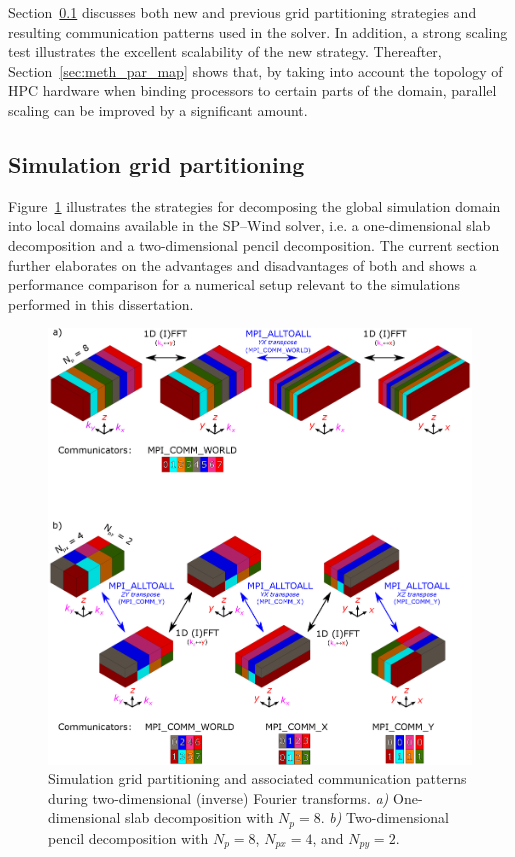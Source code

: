 Section~\ref{sec:meth_par_part} discusses both new and previous grid partitioning strategies and resulting communication patterns used in the solver. In addition, a strong scaling test illustrates the excellent scalability of the new strategy. Thereafter, Section~\ref{sec:meth_par_map} shows that, by taking into account the topology of HPC hardware when binding processors to certain parts of the domain, parallel scaling can be improved by a significant amount.

\subsection{Simulation grid partitioning}\label{sec:meth_par_part}
Figure~\ref{fig:grid_partitioning} illustrates the strategies for decomposing the global simulation domain into local domains available in the SP--Wind solver, i.e. a one-dimensional slab decomposition and a two-dimensional pencil decomposition. The current section further elaborates on the advantages and disadvantages of both and shows a performance comparison for a numerical setup relevant to the simulations performed in this dissertation. 

\begin{figure}
	\includegraphics[width=\textwidth]{figures/meth_slab_pencil.eps}
	\caption{Simulation grid partitioning and associated communication patterns during two-dimensional (inverse) Fourier transforms. \emph{a)} One-dimensional slab decomposition with $N_p = 8$. \emph{b)} Two-dimensional pencil decomposition with $N_p = 8$, $N_{px} = 4$, and $N_{py} = 2$. \label{fig:grid_partitioning}}
\end{figure}

